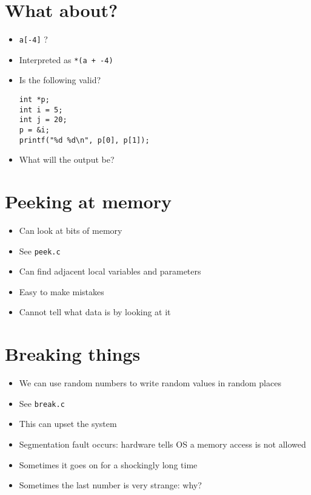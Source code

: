 \documentclass{article}
\begin{document}
\section{What about?}
\begin{itemize}
\item \verb!a[-4]! ?
\item Interpreted as \verb!*(a + -4)!

\item Is the following valid?
\begin{verbatim}
int *p;
int i = 5;
int j = 20;
p = &i;
printf("%d %d\n", p[0], p[1]);
\end{verbatim}

\item What will the output be?
\end{itemize}



\section{Peeking at memory}
\begin{itemize}
\item Can look at bits of memory
\item See \verb!peek.c!
\item Can find adjacent local variables and parameters
\item Easy to make mistakes
\item Cannot tell what data is by looking at it
\end{itemize}



\section{Breaking things}
\begin{itemize}
\item We can use random numbers to write random values in random places
\item See \verb!break.c!
\item This can upset the system
\item Segmentation fault occurs: hardware tells OS a memory access is not allowed
\item Sometimes it goes on for a shockingly long time
\item Sometimes the last number is very strange: why?
\end{itemize}
\end{document}

